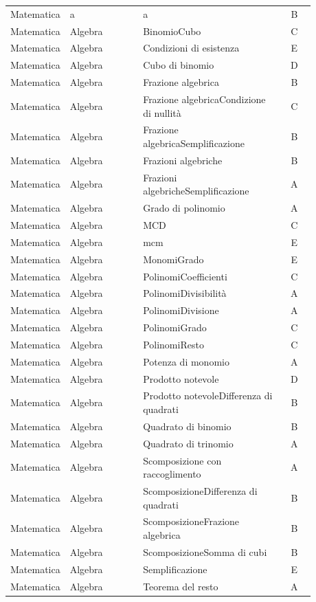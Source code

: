 \documentclass[20pt, a4paper]{article}
\begin{document}
\begin{longtable}{@{}>{\raggedright\arraybackslash}p{0.18\linewidth}>{\raggedright\arraybackslash}p{0.24\linewidth}>{\raggedright\arraybackslash}p{0.46\linewidth}c@{}}
Matematica & a & a & B \\
Matematica & Algebra & BinomioCubo & C \\
Matematica & Algebra & Condizioni di esistenza & E \\
Matematica & Algebra & Cubo di binomio & D \\
Matematica & Algebra & Frazione algebrica & B \\
Matematica & Algebra & Frazione algebricaCondizione di nullità & C \\
Matematica & Algebra & Frazione algebricaSemplificazione & B \\
Matematica & Algebra & Frazioni algebriche & B \\
Matematica & Algebra & Frazioni algebricheSemplificazione & A \\
Matematica & Algebra & Grado di polinomio & A \\
Matematica & Algebra & MCD & C \\
Matematica & Algebra & mcm & E \\
Matematica & Algebra & MonomiGrado & E \\
Matematica & Algebra & PolinomiCoefficienti & C \\
Matematica & Algebra & PolinomiDivisibilità & A \\
Matematica & Algebra & PolinomiDivisione & A \\
Matematica & Algebra & PolinomiGrado & C \\
Matematica & Algebra & PolinomiResto & C \\
Matematica & Algebra & Potenza di monomio & A \\
Matematica & Algebra & Prodotto notevole & D \\
Matematica & Algebra & Prodotto notevoleDifferenza di quadrati & B \\
Matematica & Algebra & Quadrato di binomio & B \\
Matematica & Algebra & Quadrato di trinomio & A \\
Matematica & Algebra & Scomposizione con raccoglimento & A \\
Matematica & Algebra & ScomposizioneDifferenza di quadrati & B \\
Matematica & Algebra & ScomposizioneFrazione algebrica & B \\
Matematica & Algebra & ScomposizioneSomma di cubi & B \\
Matematica & Algebra & Semplificazione & E \\
Matematica & Algebra & Teorema del resto & A \\

\end{longtable}
\end{document}
